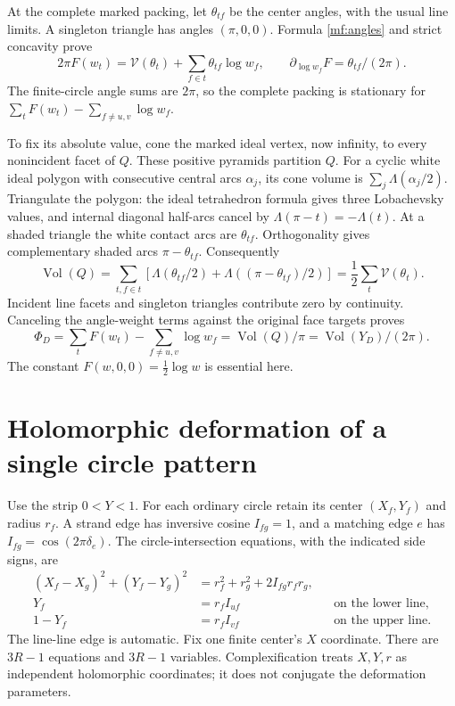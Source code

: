 \documentclass[11pt]{article}
\numberwithin{equation}{section}
\theoremstyle{definition}
\theoremstyle{remark}
\newcommand{\Vol}{\operatorname{Vol}}
\begin{document}
At the complete marked packing, let \(\theta_{tf}\) be the center
angles, with the usual line limits. A singleton triangle has angles
\((\pi,0,0)\). Formula \eqref{mf:angles} and strict concavity prove
\[
 2\pi F(w_t)=\mathcal V(\theta_t)+\sum_{f\in t}\theta_{tf}\log w_f,
 \qquad \partial_{\log w_f}F=\theta_{tf}/(2\pi).
\]
The finite-circle angle sums are \(2\pi\), so the complete packing
is stationary for
\(\sum_tF(w_t)-\sum_{f\ne u,v}\log w_f\).

To fix its absolute value, cone the marked ideal vertex, now infinity,
to every nonincident facet of \(Q\). These positive pyramids partition
\(Q\). For a cyclic white ideal polygon with consecutive central
arcs \(\alpha_j\), its cone volume is
\(\sum_j\Lambda(\alpha_j/2)\). Triangulate the polygon: the ideal
tetrahedron formula gives three Lobachevsky values, and internal
diagonal half-arcs cancel by \(\Lambda(\pi-t)=-\Lambda(t)\).
At a shaded triangle the white contact arcs are \(\theta_{tf}\).
Orthogonality gives complementary shaded arcs \(\pi-\theta_{tf}\).
Consequently
\[
 \Vol(Q)=\sum_{t,f\in t}
  \left[\Lambda(\theta_{tf}/2)+
                  \Lambda((\pi-\theta_{tf})/2)\right]
                =\frac12\sum_t\mathcal V(\theta_t).
\]
Incident line facets and singleton triangles contribute zero by
continuity. Canceling the angle-weight terms against the original
face targets proves
\begin{equation}\label{mf:Phi}
 \Phi_D=\sum_tF(w_t)-\sum_{f\ne u,v}\log w_f
                    =\Vol(Q)/\pi=\Vol(Y_D)/(2\pi).
\end{equation}
The constant \(F(w,0,0)=\frac12\log w\) is essential here.

\section{Holomorphic deformation of a single circle pattern}\label{mf:pattern}

Use the strip \(0<Y<1\). For each ordinary circle retain its center
\((X_f,Y_f)\) and radius \(r_f\). A strand edge has inversive cosine
\(I_{fg}=1\), and a matching edge \(e\) has
\(I_{fg}=\cos(2\pi\delta_e)\). The circle-intersection equations, with the indicated side signs, are
\begin{equation}\label{mf:circle-system}
\begin{aligned}
 (X_f-X_g)^2+(Y_f-Y_g)^2
          &=r_f^2+r_g^2+2I_{fg}r_fr_g,\\
 Y_f&=r_f I_{uf} &&\text{on the lower line},\\
 1-Y_f&=r_f I_{vf} &&\text{on the upper line}.
\end{aligned}
\end{equation}
The line-line edge is automatic. Fix one finite center's \(X\)
coordinate. There are \(3R-1\) equations and \(3R-1\) variables.
Complexification treats \(X,Y,r\) as independent holomorphic coordinates;
it does not conjugate the deformation parameters.
\end{document}
